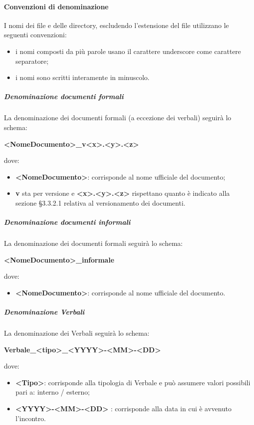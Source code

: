 			\paragraph{Convenzioni di denominazione}
				I nomi dei file e delle directory, escludendo l’estensione del file utilizzano le seguenti convenzioni:\\
				\begin{itemize}
					\item i nomi composti da più parole usano il carattere underscore come carattere separatore;
					\item i nomi sono scritti interamente in minuscolo.
				\end{itemize}
				\subparagraph{Denominazione documenti formali}
					La denominazione dei documenti formali (a eccezione dei verbali) seguirà lo schema:  \\
					\begin{center}
						\textbf{<NomeDocumento>\_v<x>.<y>.<z>}
					\end{center}
					dove: \\
					\begin{itemize}
						\item\textbf{<NomeDocumento>}: corrisponde al nome ufficiale del documento; 
						\item\textbf{v} sta per versione e \textbf{<x>.<y>.<z>} rispettano quanto è indicato alla sezione §3.3.2.1 relativa al versionamento dei documenti.
					\end{itemize}
				\subparagraph{Denominazione documenti informali}
					La denominazione dei documenti formali seguirà lo schema:  \\
					\begin{center}
						\textbf{<NomeDocumento>\_informale}
					\end{center}
					dove: \\
					\begin{itemize}
						\item\textbf{<NomeDocumento>}: corrisponde al nome ufficiale del documento.
					\end{itemize}
				\subparagraph{Denominazione Verbali}
					La denominazione dei Verbali seguirà lo schema:  \\
					\begin{center}
						\textbf{Verbale\_<tipo>\_<YYYY>-<MM>-<DD>}
					\end{center}
					dove: \\
					\begin{itemize}
						\item\textbf{<Tipo>}: corrisponde alla tipologia di Verbale e può assumere valori possibili pari a: interno / esterno;
						\item\textbf{<YYYY>-<MM>-<DD> }: corrisponde alla data in cui è avvenuto l’incontro.
					\end{itemize}
